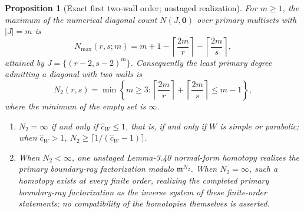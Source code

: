 \documentclass[11pt]{amsart}
\newtheorem{proposition}[theorem]{Proposition}
\theoremstyle{definition}
\theoremstyle{remark}
\newcommand{\chat}{\hat{c}}
\begin{document}
\begin{proposition}[Exact first two-wall order; unstaged realization]
\label{prop:parabolicgeom}
For $m\ge1$, the maximum of the numerical diagonal count
$N(J,\mathbf0)$ over primary multisets with $\lvert J\rvert=m$ is
\[
N_{\max}(r,s;m)
=m+1-\left\lceil\frac{2m}{r}\right\rceil
-\left\lceil\frac{2m}{s}\right\rceil ,
\]
attained by $J=\{(r-2,s-2)^m\}$. Consequently the least primary degree
admitting a diagonal with two walls is
\[
N_2(r,s)=
\min\left\{m\ge3:
\left\lceil\frac{2m}{r}\right\rceil+
\left\lceil\frac{2m}{s}\right\rceil\le m-1\right\},
\]
where the minimum of the empty set is $\infty$.
\begin{enumerate}
\item[(i)] $N_{2}=\infty$ if and only if $\chat_{W}\le1$, that is, if and only if
$W$ is simple or parabolic; when $\chat_W>1$,
$N_{2}\ge\lceil 1/(\chat_{W}-1)\rceil$.
\item[(ii)] When $N_2<\infty$, one \emph{unstaged} Lemma-3.40 normal-form
homotopy realizes the primary boundary-ray factorization modulo $\mathfrak m^{N_{2}}$. When
$N_2=\infty$, such a homotopy exists at every finite order, realizing the
completed primary boundary-ray factorization as the inverse system of these finite-order
statements; no compatibility of the homotopies themselves is asserted.
\end{enumerate}
\end{proposition}
\end{document}
